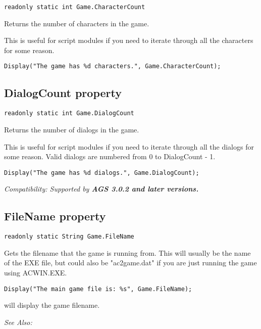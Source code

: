 \begin{verbatim}
readonly static int Game.CharacterCount
\end{verbatim}
Returns the number of characters in the game.

This is useful for script modules if you need to iterate through all the characters for some reason.

\begin{verbatim}
Display("The game has %d characters.", Game.CharacterCount);
\end{verbatim}


\subsection{DialogCount property}\label{Game.DialogCount}%

\begin{verbatim}
readonly static int Game.DialogCount
\end{verbatim}
Returns the number of dialogs in the game.

This is useful for script modules if you need to iterate through all the dialogs for some reason.
Valid dialogs are numbered from 0 to DialogCount - 1.

\begin{verbatim}
Display("The game has %d dialogs.", Game.DialogCount);
\end{verbatim}

\it{Compatibility:} Supported by \bf{AGS 3.0.2} and later versions.


\subsection{FileName property}\label{Game.FileName}%

\begin{verbatim}
readonly static String Game.FileName
\end{verbatim}
Gets the filename that the game is running from. This will usually be the name of the EXE file,
but could also be "ac2game.dat" if you are just running the game using ACWIN.EXE.

\begin{verbatim}
Display("The main game file is: %s", Game.FileName);
\end{verbatim}
will display the game filename.

\it{See Also:} 


